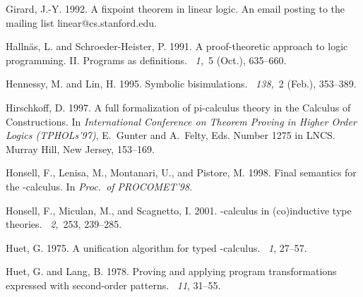 \documentclass{acmtrans2m}
\begin{document}
\begin{thebibliography}{}
{\sc Girard, J.-Y.} 1992.
\newblock A fixpoint theorem in linear logic.
\newblock An email posting to the mailing list linear@cs.stanford.edu.

{\sc Halln{\"{a}}s, L.} {\sc and} {\sc Schroeder-Heister, P.} 1991.
\newblock A proof-theoretic approach to logic programming. {II}. {Programs} as
  definitions.
~{\em 1,\/}~5 (Oct.), 635--660.

{\sc Hennessy, M.} {\sc and} {\sc Lin, H.} 1995.
\newblock Symbolic bisimulations.
~{\em 138,\/}~2 (Feb.), 353--389.

{\sc Hirschkoff, D.} 1997.
\newblock A full formalization of pi-calculus theory in the {Calculus of
  Constructions}.
\newblock In {\em International Conference on Theorem Proving in Higher Order
  Logics (TPHOLs'97)}, {E.~Gunter} {and} {A.~Felty}, Eds. Number 1275 in LNCS.
  Murray Hill, New Jersey, 153--169.

{\sc Honsell, F.}, {\sc Lenisa, M.}, {\sc Montanari, U.}, {\sc and} {\sc
  Pistore, M.} 1998.
\newblock Final semantics for the -calculus.
\newblock In {\em Proc.~of PROCOMET'98}.

{\sc Honsell, F.}, {\sc Miculan, M.}, {\sc and} {\sc Scagnetto, I.} 2001.
\newblock -calculus in (co)inductive type theories.
~{\em 2,\/}~253, 239--285.

{\sc Huet, G.} 1975.
\newblock A unification algorithm for typed -calculus.
~{\em 1}, 27--57.

{\sc Huet, G.} {\sc and} {\sc Lang, B.} 1978.
\newblock Proving and applying program transformations expressed with
  second-order patterns.
~{\em 11}, 31--55.


\end{thebibliography}
\end{document}
